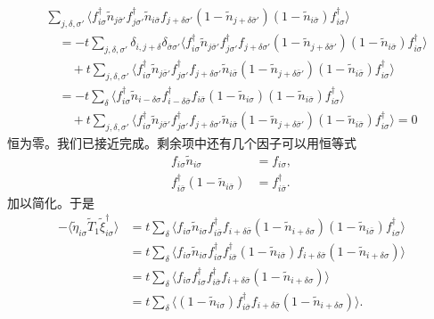 \begin{align*}
&\sum_{j,\delta,\sigma'}\big\langle f_{i\sigma}^{\dagger}\tilde{n}_{j\bar{\sigma}'}f_{j\sigma'}^{\dagger}\tilde{n}_{i\bar{\sigma}}f_{j+\delta\sigma'}(1-\tilde{n}_{j+\delta\bar{\sigma}'})(1-\tilde{n}_{i\bar{\sigma}})f_{i\sigma}^{\dagger}\big\rangle\\
&\quad=-t\sum_{j,\delta,\sigma'}\delta_{i,j+\delta}\delta_{\bar{\sigma}\sigma'}\big\langle f_{i\sigma}^{\dagger}\tilde{n}_{j\bar{\sigma}'}f_{j\sigma'}^{\dagger}f_{j+\delta\sigma'}(1-\tilde{n}_{j+\delta\bar{\sigma}'})(1-\tilde{n}_{i\bar{\sigma}})f_{i\sigma}^{\dagger}\big\rangle\\
&\qquad+t\sum_{j,\delta,\sigma'}\big\langle f_{i\sigma}^{\dagger}\tilde{n}_{j\bar{\sigma}'}f_{j\sigma'}^{\dagger}f_{j+\delta\sigma'}\tilde{n}_{i\bar{\sigma}}(1-\tilde{n}_{j+\delta\bar{\sigma}'})(1-\tilde{n}_{i\bar{\sigma}})f_{i\sigma}^{\dagger}\big\rangle\\
&\quad=-t\sum_{\delta}\big\langle f_{i\sigma}^{\dagger}\tilde{n}_{i-\delta\sigma}f_{i-\delta\bar{\sigma}}^{\dagger}f_{i\bar{\sigma}}(1-\tilde{n}_{i\sigma})(1-\tilde{n}_{i\bar{\sigma}})f_{i\sigma}^{\dagger}\big\rangle\\
&\qquad+t\sum_{j,\delta,\sigma'}\big\langle f_{i\sigma}^{\dagger}\tilde{n}_{j\bar{\sigma}'}f_{j\sigma'}^{\dagger}f_{j+\delta\sigma'}\tilde{n}_{i\bar{\sigma}}(1-\tilde{n}_{j+\delta\bar{\sigma}'})(1-\tilde{n}_{i\bar{\sigma}})f_{i\sigma}^{\dagger}\big\rangle=0\tag{16.126}
\end{align*}
恒为零。我们已接近完成。剩余项中还有几个因子可以用恒等式
\begin{align*}
f_{i\sigma}\tilde{n}_{i\sigma}&=f_{i\sigma},\\
f_{i\bar{\sigma}}^{\dagger}(1-\tilde{n}_{i\bar{\sigma}})&=f_{i\bar{\sigma}}^{\dagger}.\tag{16.127}
\end{align*}
加以简化。于是
\begin{align*}
-\langle\tilde{\eta}_{i\sigma}\tilde{T}_{1}\tilde{\xi}_{i\sigma}^{\dagger}\rangle
&=t\sum_{\delta}\big\langle f_{i\sigma}\tilde{n}_{i\sigma}f_{i\bar{\sigma}}^{\dagger}f_{i+\delta\bar{\sigma}}(1-\tilde{n}_{i+\delta\sigma})(1-\tilde{n}_{i\bar{\sigma}})f_{i\sigma}^{\dagger}\big\rangle\\
&=t\sum_{\delta}\big\langle f_{i\sigma}\tilde{n}_{i\sigma}f_{i\sigma}^{\dagger}f_{i\bar{\sigma}}^{\dagger}(1-\tilde{n}_{i\bar{\sigma}})f_{i+\delta\bar{\sigma}}(1-\tilde{n}_{i+\delta\sigma})\big\rangle\\
&=t\sum_{\delta}\big\langle f_{i\sigma}f_{i\sigma}^{\dagger}f_{i\bar{\sigma}}^{\dagger}f_{i+\delta\bar{\sigma}}(1-\tilde{n}_{i+\delta\sigma})\big\rangle\\
&=t\sum_{\delta}\Big\langle(1-\tilde{n}_{i\sigma})f_{i\bar{\sigma}}^{\dagger}f_{i+\delta\bar{\sigma}}(1-\tilde{n}_{i+\delta\sigma})\Big\rangle.\tag{16.128}
\end{align*}
